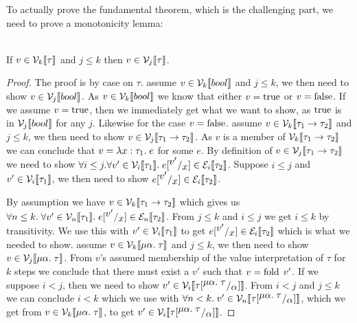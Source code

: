 To actually prove the fundamental theorem, which is the challenging part, we need to prove a monotonicity lemma:
\begin{monotonicity}[Monotonicity] ~\\
  If $v\in \vpres{\tau}$ and $j \leq k$  then $v \in \vpres[j]{\tau}$.
\end{monotonicity}
\begin{proof}
The proof is by case on $\tau$.
assume $v \in \vpres{bool}$ and $j \leq k$, we then need to show $v \in \vpres[j]{bool}$. As $v \in \vpres{bool}$ we know that either $v= \true$ or $v=\false$. If we assume $v=\true$, then we immediately get what we want to show, as $\true$ is in $\vpres[j]{bool}$ for any $j$. Likewise for the case $v=\false$.
assume $v \in \vpres{\tarrow{\tau_1}{\tau_2}}$ and $j \leq k$, we then need to show $v \in \vpres[j]{\tarrow{\tau_1}{\tau_2}}$. As $v$ is a member of $\vpres{\tarrow{\tau_1}{\tau_2}}$ we can conclude that $v = \tlabs{x}{\tau_1}{e}$ for some $e$. By definition of $v \in \vpres[j]{\tarrow{\tau_1}{\tau_2}}$ we need to show $\forall i \leq j. \forall v' \in \vpres[i]{\tau_1}.\; \sub{e}{v'}{x} \in \epres[i]{\tau_2}$. Suppose $i \leq j$ and $v' \in \vpres[i]{\tau_1}$, we then need to show $\sub{e}{v'}{x} \in \epres[i]{\tau_2}$.

By assumption we have $v \in \vpres{\tarrow{\tau_1}{\tau_2}}$ which gives us $\forall n \leq k. \; \forall v' \in \vpres[n]{\tau_1}.\; \sub{e}{v'}{x} \in \epres[n]{\tau_2}$. From $j \leq k$ and $i \leq j$ we get $i \leq k$ by transitivity. We use this with $v' \in \vpres[i]{\tau_1}$ to get $\sub{e}{v'}{x} \in \epres[i]{\tau_2}$ which is what we needed to show.
assume $v \in \vpres{\mu\alpha. \; \tau}$ and $j \leq k$, we then need to show $v \in \vpres[j]{\mu\alpha. \; \tau}$. From $v$'s assumed membership of the value interpretation of $\tau$ for $k$ steps we conclude that there must exist a $v'$ such that $v = \fold \; v'$. If we suppose $i<j$, then we need to show $v' \in \vpres[i]{\subst{\tau}{\mu\alpha.\; \tau}{\alpha}}$. From $i<j$ and $j \leq k$ we can conclude $i < k$ which we use with $\forall n < k.\; v' \in \vpres[n]{\subst{\tau}{\mu\alpha.\; \tau}{\alpha}}$, which we get from $v \in \vpres{\mu\alpha. \; \tau}$, to get $v' \in \vpres[i]{\subst{\tau}{\mu\alpha.\; \tau}{\alpha}}$.
\end{proof}
\begin{comment}
  \begin{lemma}[Substitution]
    Let $e$ be syntactically well-formed term, let $v$ be a closed value and let $\gamma$ be a substitution that map term variables to closed values, and let $x$ be a variable not in the domain of $\gamma$, then
    \[
    \extsub{\gamma}{x}{v}(e) = \subst{\gamma(e)}{x}{v}
    \]
  \end{lemma}
\end{comment}
